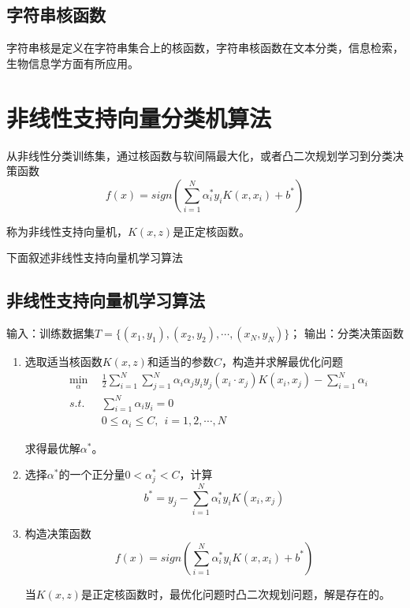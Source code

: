 \subsection*{字符串核函数}

字符串核是定义在字符串集合上的核函数，字符串核函数在文本分类，信息检索，生物信息学方面有所应用。

\section{非线性支持向量分类机算法}

\begin{define}
    从非线性分类训练集，通过核函数与软间隔最大化，或者凸二次规划学习到分类决策函数
    \begin{equation}
        f(x)=sign(\sum\limits_{i=1}^{N} \alpha^*_iy_iK(x,x_i)+b^*)
    \end{equation}

    称为非线性支持向量机，$K(x,z)$是正定核函数。
\end{define}

下面叙述非线性支持向量机学习算法

\subsection*{非线性支持向量机学习算法}
输入：训练数据集$T=\{(x_1,y_1),(x_2,y_2),\cdots,(x_N,y_N)\}$；
输出：分类决策函数
\begin{enumerate}[itemindent=2em]
    \item 选取适当核函数$K(x,z)$和适当的参数$C$，构造并求解最优化问题
    \begin{eqnarray}
        & \min\limits_{\alpha} \ \ &\frac{1}{2}\sum\limits_{i=1}^{N}\sum\limits_{j=1}^{N}
        \alpha_i\alpha_jy_iy_j(x_i\cdot x_j)K(x_i,x_j)-\sum\limits_{i=1}^{N}\alpha_i\\
        & s.t. & \sum\limits_{i=1}^{N}\alpha_iy_i=0\\
        &      & 0\leqslant \alpha_i\leqslant C,\ \ i=1,2,\cdots,N
    \end{eqnarray}

    求得最优解$\alpha^*$。
    \item 选择$\alpha^*$的一个正分量$0<\alpha^*_j<C$，计算
    \begin{equation}
        b^*=y_j-\sum\limits_{i=1}^{N}\alpha^*_iy_iK(x_i,x_j)
    \end{equation}
    \item 构造决策函数
    \begin{equation}
        f(x)=sign(\sum\limits_{i=1}^{N}\alpha^*_iy_iK(x,x_i)+b^*)
    \end{equation}

    当$K(x,z)$是正定核函数时，最优化问题时凸二次规划问题，解是存在的。
\end{enumerate}

